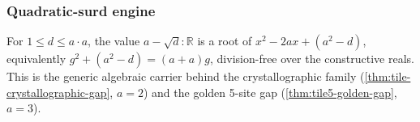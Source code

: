 \subsubsection{Quadratic-surd engine}

\begin{theorem}\label{thm:gap-quad-surd}\leanok{}
For $1\le d\le a\cdot a$, the value $a-\sqrt d:\mathbb R$ is a root of
$x^2-2ax+(a^2-d)$, equivalently
$g^2+(a^2-d)=(a+a)g$, division-free over the constructive reals. This is the
generic algebraic carrier behind the crystallographic family
(\cref{thm:tile-crystallographic-gap}, $a=2$) and the golden 5-site gap
(\cref{thm:tile5-golden-gap}, $a=3$).
\end{theorem}
